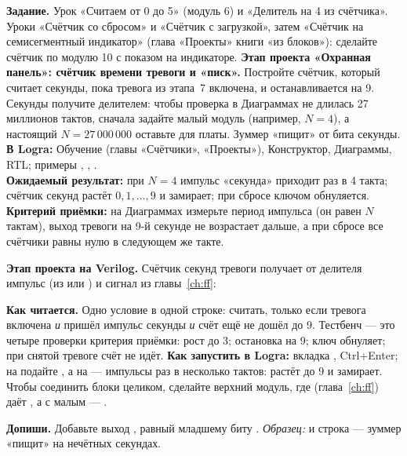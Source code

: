\begin{diybox}
\textbf{Задание.}  Урок «Считаем от 0 до 5» (модуль 6) и «Делитель на 4
из счётчика».  Уроки «Счётчик со сбросом» и «Счётчик с загрузкой»,
затем «Счётчик на семисегментный индикатор» (глава «Проекты» книги «из
блоков»): сделайте счётчик по модулю 10 с показом на индикаторе.
 \textbf{Этап проекта «Охранная панель»: счётчик времени тревоги и
«писк».} Постройте счётчик, который считает секунды, пока тревога из этапа~7
включена, и останавливается на 9. Секунды получите делителем: чтобы
проверка в Диаграммах не длилась 27 миллионов тактов, сначала задайте
малый модуль (например, $N=4$), а настоящий $N=27\,000\,000$ оставьте для платы.
Зуммер «пищит» от бита секунды.\\
\textbf{В Logra:} Обучение (главы «Счётчики», «Проекты»), Конструктор, Диаграммы,
RTL; примеры , , .\\
\textbf{Ожидаемый результат:} при $N=4$ импульс «секунда» приходит раз в 4
такта; счётчик секунд растёт $0,1,\ldots,9$ и замирает; при сбросе ключом
обнуляется.\\
\textbf{Критерий приёмки:} на Диаграммах измерьте период импульса
(он равен $N$ тактам), выход тревоги на 9-й секунде не возрастает дальше,
а при сбросе все счётчики равны нулю в следующем же такте.
\end{diybox}

\textbf{Этап проекта на Verilog.} Счётчик секунд тревоги получает от делителя
импульс  (из  или ) и сигнал
 из главы~\ref{ch:ff}:


\textbf{Как читается.} Одно условие в одной строке: считать, только если
тревога включена \emph{и} пришёл импульс секунды \emph{и} счёт ещё не дошёл
до 9. Тестбенч  --- это четыре проверки критерия
приёмки: рост до 3; остановка на 9; ключ обнуляет; при снятой тревоге счёт
не идёт. \textbf{Как запустить в Logra:} вкладка , Ctrl+Enter; на
 подайте , а на  --- импульсы
раз в несколько тактов:  растёт до 9 и замирает. Чтобы
соединить блоки целиком, сделайте верхний модуль, где 
(глава~\ref{ch:ff}) даёт , а  с малым  ---
.

\textbf{Допиши.} Добавьте выход , равный младшему биту
. \emph{Образец:}  и строка
 --- зуммер «пищит» на нечётных секундах.

